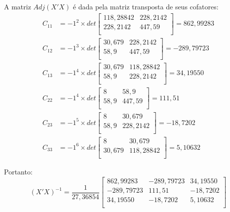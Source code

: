 \documentclass[]{ufpe-exercises}
\begin{document}
\begin{questions}
\begin{parts}
\begin{solution}
			A matriz \(Adj(X'X)\) é dada pela matriz transposta de seus cofatores:
			\begin{align*}
				C_{11} & = -1^{2} \times det
				\begin{bmatrix}
					118,28842 & 228,2142 \\
					228,2142  & 447,59   \\
				\end{bmatrix}
				= 862,99283
				\\
				C_{12} & = -1^{3} \times det
				\begin{bmatrix}
					30,679 & 228,2142 \\
					58,9   & 447,59   \\
				\end{bmatrix}
				= -289,79723
				\\
				C_{13} & = -1^{4} \times det
				\begin{bmatrix}
					30,679 & 118,28842 \\
					58,9   & 228,2142  \\
				\end{bmatrix}
				= 34,19550
				\\
				C_{22} & = -1^{4} \times det
				\begin{bmatrix}
					8    & 58,9   \\
					58,9 & 447,59 \\
				\end{bmatrix}
				= 111,51
				\\
				C_{23} & = -1^{5} \times det
				\begin{bmatrix}
					8    & 30,679   \\
					58,9 & 228,2142 \\
				\end{bmatrix}
				= -18,7202
				\\
				C_{33} & = -1^{6} \times det
				\begin{bmatrix}
					8      & 30,679    \\
					30,679 & 118,28842 \\
				\end{bmatrix}
				= 5,10632
			\end{align*}

			Portanto:
			\[
				(X'X)^{-1} = \frac{1}{27,36854}
				\begin{bmatrix}
					862,99283  & -289,79723 & 34,19550 \\
					-289,79723 & 111,51     & -18,7202 \\
					34,19550   & -18,7202   & 5,10632  \\
				\end{bmatrix}
			\]


\end{solution}
\end{parts}
\end{questions}
\end{document}
